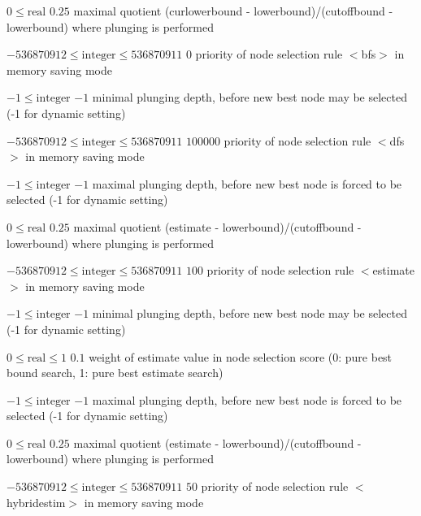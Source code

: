 %
{$0\leq\textrm{real}$}%
{$0.25$}%
{maximal quotient (curlowerbound - lowerbound)/(cutoffbound - lowerbound) where plunging is performed}%
{}

%
{$-536870912\leq\textrm{integer}\leq536870911$}%
{$0$}%
{priority of node selection rule $<$bfs$>$ in memory saving mode}%
{}

%
{$-1\leq\textrm{integer}$}%
{$-1$}%
{minimal plunging depth, before new best node may be selected (-1 for dynamic setting)}%
{}

%
{$-536870912\leq\textrm{integer}\leq536870911$}%
{$100000$}%
{priority of node selection rule $<$dfs$>$ in memory saving mode}%
{}

%
{$-1\leq\textrm{integer}$}%
{$-1$}%
{maximal plunging depth, before new best node is forced to be selected (-1 for dynamic setting)}%
{}

%
{$0\leq\textrm{real}$}%
{$0.25$}%
{maximal quotient (estimate - lowerbound)/(cutoffbound - lowerbound) where plunging is performed}%
{}

%
{$-536870912\leq\textrm{integer}\leq536870911$}%
{$100$}%
{priority of node selection rule $<$estimate$>$ in memory saving mode}%
{}

%
{$-1\leq\textrm{integer}$}%
{$-1$}%
{minimal plunging depth, before new best node may be selected (-1 for dynamic setting)}%
{}

%
{$0\leq\textrm{real}\leq1$}%
{$0.1$}%
{weight of estimate value in node selection score (0: pure best bound search, 1: pure best estimate search)}%
{}

%
{$-1\leq\textrm{integer}$}%
{$-1$}%
{maximal plunging depth, before new best node is forced to be selected (-1 for dynamic setting)}%
{}

%
{$0\leq\textrm{real}$}%
{$0.25$}%
{maximal quotient (estimate - lowerbound)/(cutoffbound - lowerbound) where plunging is performed}%
{}

%
{$-536870912\leq\textrm{integer}\leq536870911$}%
{$50$}%
{priority of node selection rule $<$hybridestim$>$ in memory saving mode}%
{}


